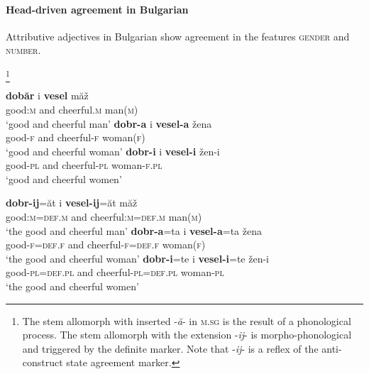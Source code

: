 \paragraph*{Head\hyp{}driven agreement in Bulgarian}
Attributive adjectives in Bulgarian show agreement in the features \textsc{gender} and \textsc{number}.
\begin{exe}
\footnote{The stem allomorph with inserted -\textit{ă}- in \textsc{m.sg} is the result of a phonological process. The stem allomorph with the extension -\textit{ij}- is morpho-phonological and triggered by the definite marker. Note that -\textit{ij}- is a reflex of the  anti\hyp{}construct state agreement marker.}
\begin{xlist}
\begin{xlist}
\ex
\gll	\textbf{dobăr} i \textbf{vesel} măž\\
	good:\textsc{m} and cheerful.\textsc{m} man(\textsc{m})\\
\glt	‘good and cheerful man’
\ex
\gll	\textbf{dobr-a} i \textbf{vesel-a} žena\\
	good-\textsc{f} and cheerful-\textsc{f} woman(\textsc{f})\\
\glt	‘good and cheerful woman’
\ex
\gll	\textbf{dobr-i} i \textbf{vesel-i} žen-i\\
	good-\textsc{pl} and cheerful-\textsc{pl} woman-\textsc{f.pl}\\
\glt	‘good and cheerful women’
\end{xlist}
\begin{xlist}
\ex
\gll	\textbf{dobr-ij}=ăt i \textbf{vesel-ij}=ăt măž\\
	good:\textsc{m}=\textsc{def.m} and cheerful:\textsc{m}=\textsc{def.m} man(\textsc{m})\\
\glt	‘the good and cheerful man’
\ex
\gll	\textbf{dobr-a}=ta i \textbf{vesel-a}=ta žena\\
	good-\textsc{f}=\textsc{def.f} and cheerful-\textsc{f}=\textsc{def.f} woman(\textsc{f})\\
\glt	‘the good and cheerful woman’
\ex
\gll	\textbf{dobr-i}=te i \textbf{vesel-i}=te žen-i\\
	good-\textsc{pl}=\textsc{def.pl} and cheerful-\textsc{pl}=\textsc{def.pl} woman-\textsc{pl}\\
\glt	‘the good and cheerful women’
\end{xlist}
\end{xlist}
\end{exe}


